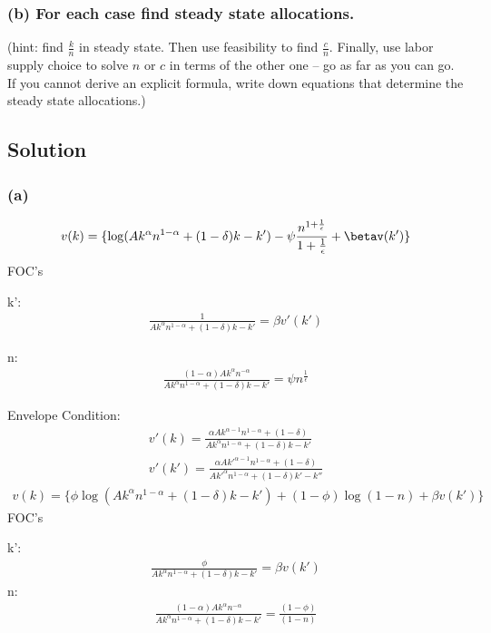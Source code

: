 \documentclass[10pt, a4paper]{article}
\begin{document}
    \subsubsection*{(b) For each case find steady state allocations.}
    (hint: find $\frac{k}{n}$ in steady state. Then use feasibility to find $\frac{c}{n}$. Finally, use labor supply choice to solve $n$ or $c$ in terms of the other one – go as far as you can go. If you cannot derive an explicit formula, write down equations that determine the steady state allocations.)

  \subsection*{Solution}
  \subsubsection*{(a)}
    \begin{gather*}
      v(k) = \{\log(Ak^{\alpha}n^{1-\alpha}+(1-\delta)k-k')-\psi\frac{n^{1+\frac{1}{\epsilon}}}{1+\frac{1}{\epsilon}}+\betav(k')\}
    \end{gather*}
    FOC's
    
    k':
    \begin{gather*}
      \frac{1}{Ak^{\alpha}n^{1-\alpha}+(1-\delta)k-k'} = \beta v'(k')
    \end{gather*}
    
    n:
    \begin{gather*}
      \frac{(1-\alpha)Ak^{\alpha}n^{-\alpha}}{Ak^{\alpha}n^{1-\alpha}+(1-\delta)k-k'} = \psi n^{\frac{1}{\epsilon}}
    \end{gather*}

    Envelope Condition:
    \begin{gather*}
      v'(k) = \frac{\alpha Ak^{\alpha-1}n^{1-\alpha}+(1-\delta)}{Ak^{\alpha}n^{1-\alpha}+(1-\delta)k-k'}\\
      v'(k') = \frac{\alpha Ak'^{\alpha-1}n^{1-\alpha}+(1-\delta)}{Ak'^{\alpha}n^{1-\alpha}+(1-\delta)k'-k''}
    \end{gather*}
    \begin{gather*}
      v(k) = \{\phi\log(Ak^{\alpha}n^{1-\alpha}+(1-\delta)k-k')+(1-\phi)\log(1-n)+\beta v(k')\}
    \end{gather*}
    FOC's

    k':
    \begin{gather*}
      \frac{\phi}{Ak^{\alpha}n^{1-\alpha}+(1-\delta)k-k'}=\beta v(k')
    \end{gather*}
    n:
    \begin{gather*}
      \frac{(1-\alpha)Ak^{\alpha}n^{-\alpha}}{Ak^{\alpha}n^{1-\alpha}+(1-\delta)k-k'} = \frac{(1-\phi)}{(1-n)}
    \end{gather*}
\end{document}
